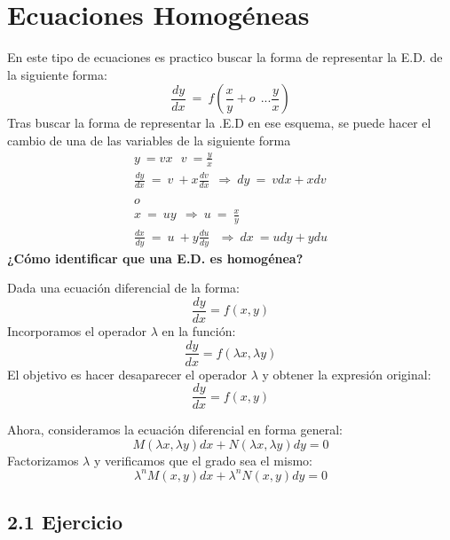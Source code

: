 \section{Ecuaciones Homogéneas}
En este tipo de ecuaciones es practico buscar la forma de representar la E.D. de la siguiente forma:
\begin{equation*}
\frac{dy}{dx} \ =\ f\left(\frac{x}{y} +o\ \ ...\frac{y}{x}\right)
\end{equation*}
Tras buscar la forma de representar la .E.D en ese esquema, se puede hacer el cambio de una de las variables de la siguiente forma
\begin{gather*}
y\ =vx\ \ \ v\ =\frac{y}{x}\\
\frac{dy}{dx} \ =\ v\ +x\frac{dv}{dx} \ \ \Longrightarrow \ dy\ =\ vdx+xdv\\
\\
o\\
x\ =\ uy\ \ \Longrightarrow \ u\ =\ \frac{x}{y}\\
\frac{dx}{dy} \ =\ u\ +y\frac{du}{dy} \ \ \ \Longrightarrow \ dx\ =udy+ydu
\end{gather*}
\textbf{¿Cómo identificar que una E.D. es homogénea?}

Dada una ecuación diferencial de la forma:
\begin{equation*}
    \frac{dy}{dx} = f(x,y)
\end{equation*}
Incorporamos el operador \(\lambda\) en la función:
\begin{equation*}
    \frac{dy}{dx} = f(\lambda x, \lambda y)
\end{equation*}
El objetivo es hacer desaparecer el operador \(\lambda\) y obtener la expresión original:
\begin{equation*}
    \frac{dy}{dx} = f(x,y)
\end{equation*}

Ahora, consideramos la ecuación diferencial en forma general:
\begin{equation*}
    M(\lambda x, \lambda y) dx + N(\lambda x, \lambda y) dy = 0
\end{equation*}
Factorizamos \(\lambda\) y verificamos que el grado sea el mismo:
\begin{equation*}
    \lambda^n M(x,y) dx + \lambda^n N(x,y) dy = 0
\end{equation*}

\subsection*{ 2.1 Ejercicio}


